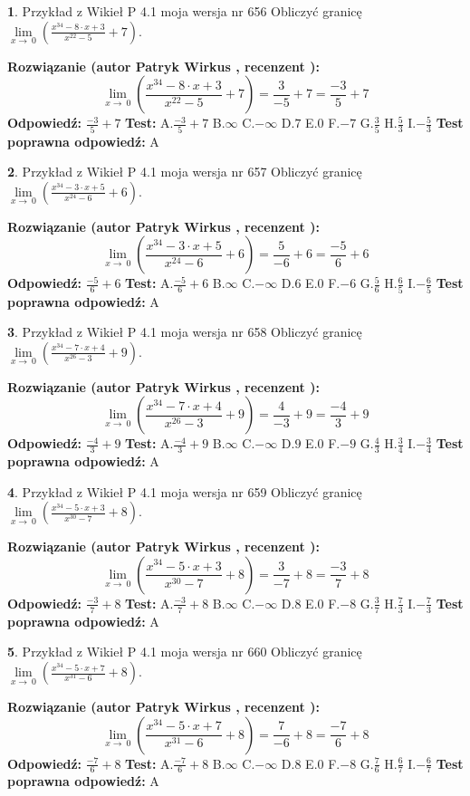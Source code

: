 \documentclass[12pt, a4paper]{article}
\theoremstyle{definition} %
\newtheorem{zad}{}
\newcommand{\zadStart}[1]{\begin{zad}#1\newline}
\newcommand{\zadStop}{\end{zad}}
\newcommand{\rozwStart}[2]{\noindent \textbf{Rozwiązanie (autor #1 , recenzent #2): }\newline}
\newcommand{\rozwStop}{\newline}
\newcommand{\odpStart}{\noindent \textbf{Odpowiedź:}\newline}
\newcommand{\odpStop}{\newline}
\newcommand{\testStart}{\noindent \textbf{Test:}\newline}
\newcommand{\testStop}{\newline}
\newcommand{\kluczStart}{\noindent \textbf{Test poprawna odpowiedź:}\newline}
\newcommand{\kluczStop}{\newline}
\begin{document}
\zadStart{Przykład z Wikieł P 4.1 moja wersja nr 656}
Obliczyć granicę $\lim\limits_{x\to\ 0}(\frac{x^{34}-8 \cdot x +3}{x^{22}-5}+7)$.
\zadStop
\rozwStart{Patryk Wirkus}{}
$$\lim\limits_{x\to\ 0}(\frac{x^{34}-8 \cdot x +3}{x^{22}-5}+7)=\frac{3}{-5}+7=\frac{-3}{5}+7$$
\rozwStop
\odpStart
$\frac{-3}{5}+7$
\odpStop
\testStart
A.$\frac{-3}{5}+7$
B.$\infty$
C.$-\infty$
D.$7$
E.$0$
F.$-7$
G.$\frac{3}{5}$
H.$\frac{5}{3}$
I.$-\frac{5}{3}$
\testStop
\kluczStart
A
\kluczStop



\zadStart{Przykład z Wikieł P 4.1 moja wersja nr 657}
Obliczyć granicę $\lim\limits_{x\to\ 0}(\frac{x^{34}-3 \cdot x +5}{x^{24}-6}+6)$.
\zadStop
\rozwStart{Patryk Wirkus}{}
$$\lim\limits_{x\to\ 0}(\frac{x^{34}-3 \cdot x +5}{x^{24}-6}+6)=\frac{5}{-6}+6=\frac{-5}{6}+6$$
\rozwStop
\odpStart
$\frac{-5}{6}+6$
\odpStop
\testStart
A.$\frac{-5}{6}+6$
B.$\infty$
C.$-\infty$
D.$6$
E.$0$
F.$-6$
G.$\frac{5}{6}$
H.$\frac{6}{5}$
I.$-\frac{6}{5}$
\testStop
\kluczStart
A
\kluczStop



\zadStart{Przykład z Wikieł P 4.1 moja wersja nr 658}
Obliczyć granicę $\lim\limits_{x\to\ 0}(\frac{x^{34}-7 \cdot x +4}{x^{26}-3}+9)$.
\zadStop
\rozwStart{Patryk Wirkus}{}
$$\lim\limits_{x\to\ 0}(\frac{x^{34}-7 \cdot x +4}{x^{26}-3}+9)=\frac{4}{-3}+9=\frac{-4}{3}+9$$
\rozwStop
\odpStart
$\frac{-4}{3}+9$
\odpStop
\testStart
A.$\frac{-4}{3}+9$
B.$\infty$
C.$-\infty$
D.$9$
E.$0$
F.$-9$
G.$\frac{4}{3}$
H.$\frac{3}{4}$
I.$-\frac{3}{4}$
\testStop
\kluczStart
A
\kluczStop



\zadStart{Przykład z Wikieł P 4.1 moja wersja nr 659}
Obliczyć granicę $\lim\limits_{x\to\ 0}(\frac{x^{34}-5 \cdot x +3}{x^{30}-7}+8)$.
\zadStop
\rozwStart{Patryk Wirkus}{}
$$\lim\limits_{x\to\ 0}(\frac{x^{34}-5 \cdot x +3}{x^{30}-7}+8)=\frac{3}{-7}+8=\frac{-3}{7}+8$$
\rozwStop
\odpStart
$\frac{-3}{7}+8$
\odpStop
\testStart
A.$\frac{-3}{7}+8$
B.$\infty$
C.$-\infty$
D.$8$
E.$0$
F.$-8$
G.$\frac{3}{7}$
H.$\frac{7}{3}$
I.$-\frac{7}{3}$
\testStop
\kluczStart
A
\kluczStop



\zadStart{Przykład z Wikieł P 4.1 moja wersja nr 660}
Obliczyć granicę $\lim\limits_{x\to\ 0}(\frac{x^{34}-5 \cdot x +7}{x^{31}-6}+8)$.
\zadStop
\rozwStart{Patryk Wirkus}{}
$$\lim\limits_{x\to\ 0}(\frac{x^{34}-5 \cdot x +7}{x^{31}-6}+8)=\frac{7}{-6}+8=\frac{-7}{6}+8$$
\rozwStop
\odpStart
$\frac{-7}{6}+8$
\odpStop
\testStart
A.$\frac{-7}{6}+8$
B.$\infty$
C.$-\infty$
D.$8$
E.$0$
F.$-8$
G.$\frac{7}{6}$
H.$\frac{6}{7}$
I.$-\frac{6}{7}$
\testStop
\kluczStart
A
\kluczStop
\end{document}
